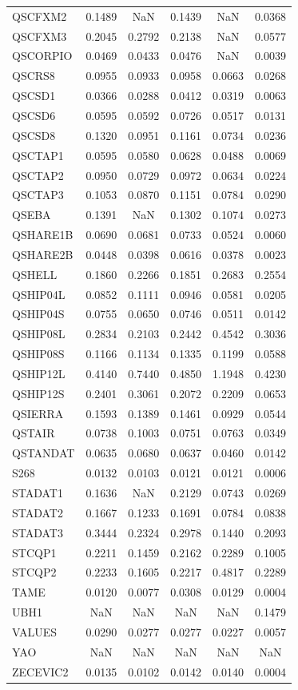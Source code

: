 \begin{longtable}{lccccc}
QSCFXM2 & 0.1489 & NaN & 0.1439 & NaN & 0.0368 \\
QSCFXM3 & 0.2045 & 0.2792 & 0.2138 & NaN & 0.0577 \\
QSCORPIO & 0.0469 & 0.0433 & 0.0476 & NaN & 0.0039 \\
QSCRS8 & 0.0955 & 0.0933 & 0.0958 & 0.0663 & 0.0268 \\
QSCSD1 & 0.0366 & 0.0288 & 0.0412 & 0.0319 & 0.0063 \\
QSCSD6 & 0.0595 & 0.0592 & 0.0726 & 0.0517 & 0.0131 \\
QSCSD8 & 0.1320 & 0.0951 & 0.1161 & 0.0734 & 0.0236 \\
QSCTAP1 & 0.0595 & 0.0580 & 0.0628 & 0.0488 & 0.0069 \\
QSCTAP2 & 0.0950 & 0.0729 & 0.0972 & 0.0634 & 0.0224 \\
QSCTAP3 & 0.1053 & 0.0870 & 0.1151 & 0.0784 & 0.0290 \\
QSEBA & 0.1391 & NaN & 0.1302 & 0.1074 & 0.0273 \\
QSHARE1B & 0.0690 & 0.0681 & 0.0733 & 0.0524 & 0.0060 \\
QSHARE2B & 0.0448 & 0.0398 & 0.0616 & 0.0378 & 0.0023 \\
QSHELL & 0.1860 & 0.2266 & 0.1851 & 0.2683 & 0.2554 \\
QSHIP04L & 0.0852 & 0.1111 & 0.0946 & 0.0581 & 0.0205 \\
QSHIP04S & 0.0755 & 0.0650 & 0.0746 & 0.0511 & 0.0142 \\
QSHIP08L & 0.2834 & 0.2103 & 0.2442 & 0.4542 & 0.3036 \\
QSHIP08S & 0.1166 & 0.1134 & 0.1335 & 0.1199 & 0.0588 \\
QSHIP12L & 0.4140 & 0.7440 & 0.4850 & 1.1948 & 0.4230 \\
QSHIP12S & 0.2401 & 0.3061 & 0.2072 & 0.2209 & 0.0653 \\
QSIERRA & 0.1593 & 0.1389 & 0.1461 & 0.0929 & 0.0544 \\
QSTAIR & 0.0738 & 0.1003 & 0.0751 & 0.0763 & 0.0349 \\
QSTANDAT & 0.0635 & 0.0680 & 0.0637 & 0.0460 & 0.0142 \\
S268 & 0.0132 & 0.0103 & 0.0121 & 0.0121 & 0.0006 \\
STADAT1 & 0.1636 & NaN & 0.2129 & 0.0743 & 0.0269 \\
STADAT2 & 0.1667 & 0.1233 & 0.1691 & 0.0784 & 0.0838 \\
STADAT3 & 0.3444 & 0.2324 & 0.2978 & 0.1440 & 0.2093 \\
STCQP1 & 0.2211 & 0.1459 & 0.2162 & 0.2289 & 0.1005 \\
STCQP2 & 0.2233 & 0.1605 & 0.2217 & 0.4817 & 0.2289 \\
TAME & 0.0120 & 0.0077 & 0.0308 & 0.0129 & 0.0004 \\
UBH1 & NaN & NaN & NaN & NaN & 0.1479 \\
VALUES & 0.0290 & 0.0277 & 0.0277 & 0.0227 & 0.0057 \\
YAO & NaN & NaN & NaN & NaN & NaN \\
ZECEVIC2 & 0.0135 & 0.0102 & 0.0142 & 0.0140 & 0.0004 \\
\end{longtable}
